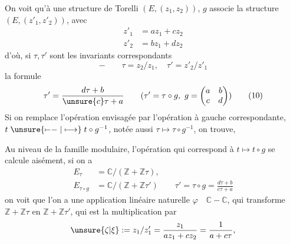 On voit qu'à une structure de Torelli $(E,(z_1,z_2))$, $g$ associe la structure $(E,(z'_1,z'_2))$, avec
\[
\begin{aligned}
z'_1&=az_1+cz_2\\
z'_2&=bz_1+dz_2
\end{aligned}
\]
d'où, si $\tau,\tau'$ sont les invariants correspondants
\[
-\qquad\tau=z_2/z_1,\quad\tau'=z'_2/z'_1
\]
la formule
\begin{equation}
\tau'=\frac{d\tau+b}{\unsure{c}\tau+a}
\qquad
(\tau'=\tau\circ g,\ g=\begin{pmatrix}a&b\\c&d\end{pmatrix})
\tag{10}
\end{equation}
Si on remplace l'opération envisagée par l'opération à gauche correspondante,  $t\mathrel{\unsure{\mapstochar\relbar\relbar|\longmapsto}}t\circ g^{-1}$, notée aussi $\tau\longmapsto\tau\circ g^{-1}$, on trouve,

Au niveau de la famille modulaire, l'opération qui correspond à $t\longmapsto t\circ g$ se calcule aisément, si on a
\[
\begin{aligned}
E_\tau&=\mathbb C/(\mathbb Z+\mathbb Z\tau),\\
E_{\tau\circ g}&=\mathbb C/(\mathbb Z+\mathbb Z\tau')
\qquad
\tau'=\tau\circ g=\frac{d\tau+b}{c\tau+a}
\end{aligned}
\]
on voit que l'on a une application  linéaire naturelle $\varphi\quad\mathbb C-\mathbb C$, qui transforme $\mathbb Z+\mathbb Z\tau$ en $\mathbb Z+\mathbb Z\tau'$, qui est la multiplication par
\[
\unsure{\zeta|\xi}:=z_1/z'_1
=\frac{z_1}{az_1+cz_2}
=\frac{1}{a+c\tau},
\]


